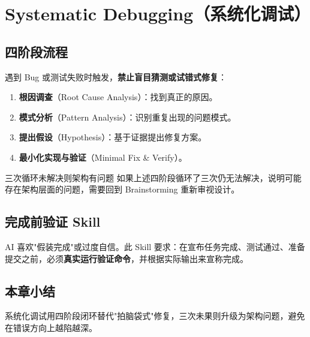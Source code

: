 \section{Systematic Debugging（系统化调试）}

\subsection{四阶段流程}

遇到 Bug 或测试失败时触发，\textbf{禁止盲目猜测或试错式修复}：

\begin{enumerate}
    \item \textbf{根因调查}（Root Cause Analysis）：找到真正的原因。
    \item \textbf{模式分析}（Pattern Analysis）：识别重复出现的问题模式。
    \item \textbf{提出假设}（Hypothesis）：基于证据提出修复方案。
    \item \textbf{最小化实现与验证}（Minimal Fix \& Verify）。
\end{enumerate}

\begin{warningbox}{三次循环未解决则架构有问题}
如果上述四阶段循环了三次仍无法解决，说明可能存在架构层面的问题，需要回到 Brainstorming 重新审视设计。
\end{warningbox}

\subsection{完成前验证 Skill}

AI 喜欢"假装完成"或过度自信。此 Skill 要求：在宣布任务完成、测试通过、准备提交之前，必须\textbf{真实运行验证命令}，并根据实际输出来宣称完成。

\subsection{本章小结}

系统化调试用四阶段闭环替代"拍脑袋式"修复，三次未果则升级为架构问题，避免在错误方向上越陷越深。


